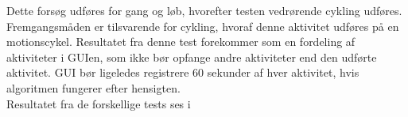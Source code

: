 Dette forsøg udføres for gang og løb, hvorefter testen vedrørende cykling udføres. Fremgangsmåden er tilsvarende for cykling, hvoraf denne aktivitet udføres på en motionscykel. Resultatet fra denne test forekommer som en fordeling af aktiviteter i GUIen, som ikke bør opfange andre aktiviteter end den udførte aktivitet. GUI bør ligeledes registrere 60 sekunder af hver aktivitet, hvis algoritmen fungerer efter hensigten. \\
Resultatet fra de forskellige tests ses i 
\begin{table}[H]
	\centering
\end{table}
